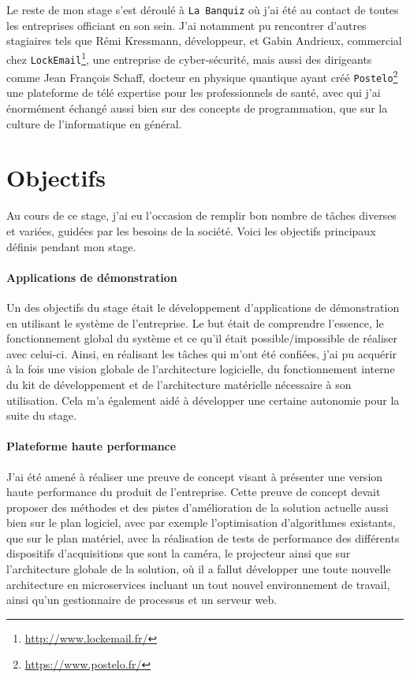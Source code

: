 Le reste de mon stage s'est déroulé à \texttt{La Banquiz} où j'ai été au contact de toutes les entreprises officiant en son sein. J'ai notamment pu rencontrer d'autres stagiaires tels que Rémi Kressmann, développeur, et Gabin Andrieux, commercial chez \texttt{LockEmail}\footnote{\href{http://www.lockemail.fr/}{http://www.lockemail.fr/}}, une entreprise de cyber-sécurité, mais aussi des dirigeants comme Jean François Schaff, docteur en physique quantique ayant créé  \texttt{Postelo}\footnote{\href{https://www.postelo.fr/}{https://www.postelo.fr/}} une plateforme de télé expertise pour les professionnels de santé, avec qui j'ai énormément échangé aussi bien sur des concepts de programmation, que sur la culture de l'informatique en général.

\section{Objectifs}

Au cours de ce stage, j'ai eu l'occasion de remplir bon nombre de tâches diverses et variées, guidées par les besoins de la société. Voici les objectifs principaux définis pendant mon stage.

\paragraph{Applications de démonstration} Un des objectifs du stage était le développement d'applications de démonstration en utilisant le système de l'entreprise. Le but était de comprendre l'essence, le fonctionnement global du système et ce qu'il était possible/impossible de réaliser avec celui-ci. Ainsi, en réalisant les tâches qui m'ont été confiées, j'ai pu acquérir à la fois une vision globale de l'architecture logicielle, du fonctionnement interne du kit de développement et de l'architecture matérielle nécessaire à son utilisation. Cela m'a également aidé à développer une certaine autonomie pour la suite du stage.

\paragraph{Plateforme haute performance} J'ai été amené à réaliser une preuve de concept visant à présenter une version haute performance du produit de l'entreprise. Cette preuve de concept devait proposer des méthodes et des pistes d'amélioration de la solution actuelle aussi bien sur le plan logiciel, avec par exemple l'optimisation d'algorithmes existants, que sur le plan matériel, avec la réalisation de tests de performance des différents dispositifs d'acquisitions que sont la caméra, le projecteur ainsi que sur l'architecture globale de la solution, où il a fallut développer une toute nouvelle architecture en microservices incluant un tout nouvel environnement de travail, ainsi qu'un gestionnaire de processus et un serveur web.

